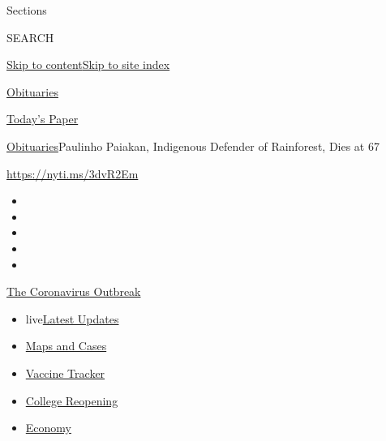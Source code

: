 Sections

SEARCH

\protect\hyperlink{site-content}{Skip to
content}\protect\hyperlink{site-index}{Skip to site index}

\href{https://www.nytimes.com/section/obituaries}{Obituaries}

\href{https://myaccount.nytimes.com/auth/login?response_type=cookie\&client_id=vi}{}

\href{https://www.nytimes.com/section/todayspaper}{Today's Paper}

\href{/section/obituaries}{Obituaries}\textbar{}Paulinho Paiakan,
Indigenous Defender of Rainforest, Dies at 67

\url{https://nyti.ms/3dvR2Em}

\begin{itemize}
\item
\item
\item
\item
\item
\end{itemize}

\href{https://www.nytimes.com/news-event/coronavirus?action=click\&pgtype=Article\&state=default\&region=TOP_BANNER\&context=storylines_menu}{The
Coronavirus Outbreak}

\begin{itemize}
\tightlist
\item
  live\href{https://www.nytimes.com/2020/08/03/world/coronavirus-covid-19.html?action=click\&pgtype=Article\&state=default\&region=TOP_BANNER\&context=storylines_menu}{Latest
  Updates}
\item
  \href{https://www.nytimes.com/interactive/2020/us/coronavirus-us-cases.html?action=click\&pgtype=Article\&state=default\&region=TOP_BANNER\&context=storylines_menu}{Maps
  and Cases}
\item
  \href{https://www.nytimes.com/interactive/2020/science/coronavirus-vaccine-tracker.html?action=click\&pgtype=Article\&state=default\&region=TOP_BANNER\&context=storylines_menu}{Vaccine
  Tracker}
\item
  \href{https://www.nytimes.com/2020/08/02/us/covid-college-reopening.html?action=click\&pgtype=Article\&state=default\&region=TOP_BANNER\&context=storylines_menu}{College
  Reopening}
\item
  \href{https://www.nytimes.com/live/2020/08/03/business/stock-market-today-coronavirus?action=click\&pgtype=Article\&state=default\&region=TOP_BANNER\&context=storylines_menu}{Economy}
\end{itemize}

